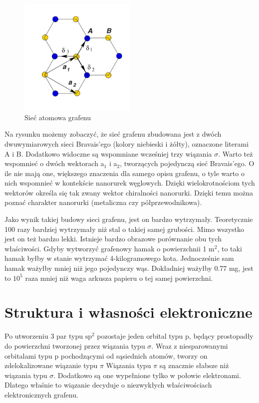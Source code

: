 	\vspace{-10pt}
	\begin{figure}[ht]
	\centering
	\includegraphics[width=0.50\textwidth]{./Rozdzial_2/obrazki/Siec_grafen.jpg}
	\caption{Sieć atomowa grafenu}
	\label{fig:siec_grafenu}
	\end{figure}
	\vspace{-10pt}

	Na rysunku możemy zobaczyć, że sieć grafenu zbudowana jest z dwóch dwuwymiarowych sieci Bravais'ego (kolory 
	niebieski i żółty), oznaczone literami A i B. Dodatkowo widoczne są wspomniane wcześniej trzy wiązania $\sigma$.
	Warto też wspomnieć o dwóch wektorach a$_1$ i a$_2$, tworzących pojedynczą sieć Bravais'ego. O ile nie mają one,
	większego znaczenia dla samego opisu grafenu, o tyle warto o nich wspomnieć w kontekście nanorurek węglowych. Dzięki
	wielokrotnościom tych wektorów określa się tak zwany wektor chiralności nanorurki. Dzięki temu można poznać charakter
	nanorurki (metaliczna czy półprzewodnikowa).
	
	Jako wynik takiej budowy sieci grafenu, jest on bardzo wytrzymały. Teoretycznie 100 razy bardziej wytrzymały niż
	stal o takiej samej grubości. Mimo wszystko jest on też bardzo lekki. Istnieje bardzo obrazowe
	porównanie obu tych właściwości. Gdyby wytworzyć grafenowy hamak o powierzchnii 1 m$^2$, to taki hamak byłby
	w stanie wytrzymać 4-kilogramowego kota. Jednocześnie sam hamak  ważyłby mniej niż jego pojedynczy wąs. 
	Dokładniej ważyłby 0.77 mg, jest to $10^{5}$ raza mniej niż waga arkusza papieru o tej samej powierzchni.

	\section{Struktura i własności elektroniczne}
	Po utworzeniu 3 par typu $\mathrm{sp^2}$ pozostaje jeden orbital typu p, będący prostopadły do
	powierzchni tworzonej przez wiązania typu $\sigma$. Wraz z niesparowanymi orbitalami typu p pochodzącymi od
	 sąsiednich atomów,  tworzy on zdelokalizowane wiązanie typu $\pi$
	Wiązania typu $\pi$ są znacznie słabsze niż wiązania typu $\sigma$. Dodatkowo są one 
	wypełnione tylko w połowie elektronami. Dlatego właśnie to wiązanie decyduje o niezwykłych właściwościach 
	elektronicznych grafenu.

